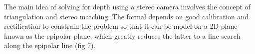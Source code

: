 
 The main idea of solving for depth using a stereo camera involves the concept of triangulation and stereo matching. The formal depends on good calibration and rectification to constrain the problem so that it can be model on a 2D plane known as the epipolar plane, which greatly reduces the latter to a line search along the epipolar line (fig 7). 